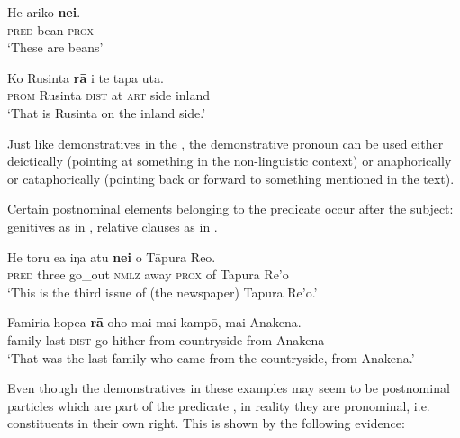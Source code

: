\ea\label{ex:4.239}
\gll He {\ꞌ}ariko \textbf{nei}. \\
\textsc{pred} bean \textsc{prox} \\

\glt 
‘These are beans’ \textstyleExampleref{[Notes]}
\z

\ea\label{ex:4.240}
\gll Ko Rusinta \textbf{rā} {\ꞌ}i te tapa {\ꞌ}uta. \\
\textsc{prom} Rusinta \textsc{dist} at \textsc{art} side inland \\

\glt
‘That is Rusinta on the inland side.’ \textstyleExampleref{[R411.074]} 
\z

Just like demonstratives in the , the demonstrative pronoun can be used either deictically (pointing at something in the non-linguistic context) or anaphorically or cataphorically (pointing back or forward to something mentioned in the text).

Certain postnominal elements belonging to the predicate  occur after the subject: genitives as in , relative clauses as in . 

\ea\label{ex:4.241}
\gll He toru e{\ꞌ}a iŋa atu \textbf{nei} o Tāpura Re{\ꞌ}o. \\
\textsc{pred} three go\_out \textsc{nmlz} away \textsc{prox} of Tapura Re’o \\

\glt 
‘This is the third issue of (the newspaper) Tapura Re’o.’ \textstyleExampleref{[R649.001]} 
\z

\ea\label{ex:4.242}
\gll Famiria hope{\ꞌ}a \textbf{rā} oho mai mai kampō, mai {\ꞌ}Anakena. \\
family last \textsc{dist} go hither from countryside from Anakena \\

\glt
‘That was the last family who came from the countryside, from Anakena.’ \textstyleExampleref{[R413.889]} 
\z

Even though the demonstratives in these examples may seem to be postnominal particles which are part of the predicate , in reality they are pronominal, i.e. constituents in their own right. This is shown by the following evidence:

